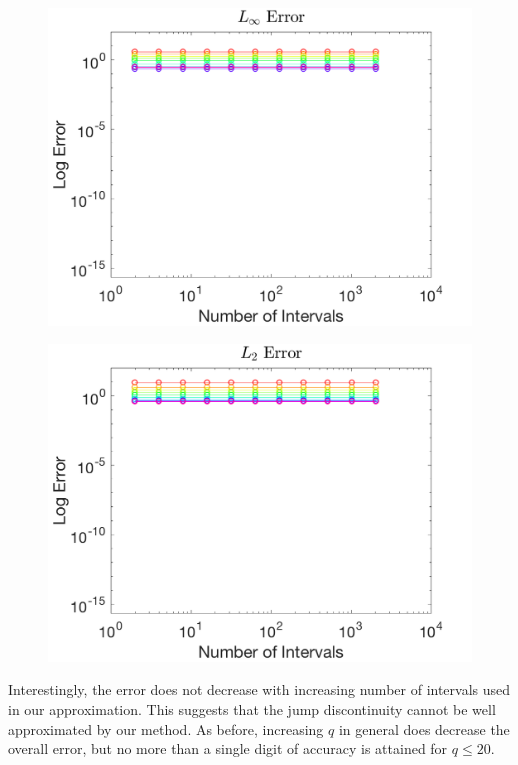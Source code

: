 \documentclass{article}
\begin{document}
\begin{figure}[H]
  \centering
  \begin{minipage}{.6\textwidth}
    \centering
    \includegraphics[width=\linewidth]{maxError_3.png}
    \label{fig:max3}
  \end{minipage}%
  \begin{minipage}{.6\textwidth}
    \centering
    \includegraphics[width=\linewidth]{squareError_3.png}
    \label{fig:square3}
  \end{minipage}%
\end{figure}
\noindent Interestingly, the error does not decrease with increasing number of intervals used in our approximation. This suggests that the jump discontinuity cannot be well approximated by our method. As before, increasing $q$ in general does decrease the overall error, but no more than a single digit of accuracy is attained for $q \leq 20$. 
\end{document}
